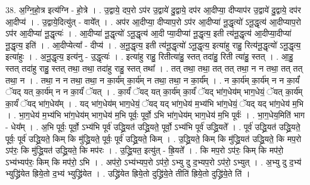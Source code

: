 \documentclass[17pt]{extarticle}
\begin{document}
38. अ॒ग्नि॒हो॒त्र इत्य॑ग्नि - हो॒त्रे । . उ॒द्वाये॒ दप॒रो ऽप॑र उ॒द्वाये॑ दु॒द्वाये॒ दप॑र आ॒दीप्या॒ दीप्याप॑र उ॒द्वाये॑ दु॒द्वाये॒ दप॑र आ॒दीप्य॑ । . उ॒द्वाये॒दित्यु॑त् - वाये᳚त् । . अप॑र आ॒दीप्या॒ दीप्याप॒रो ऽप॑र आ॒दीप्या॑ नू॒द्धृत्यो॑ ऽनू॒द्धृत्य॑ आ॒दीप्याप॒रो ऽप॑र आ॒दीप्या॑ नू॒द्धृत्यः॑ । . आ॒दीप्या॑ नू॒द्धृत्यो॑ ऽनू॒द्धृत्य॑ आ॒दी प्या॒दीप्या॑ नू॒द्धृत्य॒ इती त्य॑नू॒द्धृत्य॑ आ॒दीप्या॒दीप्या॑ नू॒द्धृत्य॒ इति॑ । . आ॒दीप्येत्या᳚ - दीप्य॑ । . अ॒नू॒द्धृत्य॒ इती त्य॑नू॒द्धृत्यो॑ ऽनू॒द्धृत्य॒ इत्या॑हु राहु॒ रित्य॑नू॒द्धृत्यो॑ ऽनू॒द्धृत्य॒ इत्या॑हुः । . अ॒नू॒द्धृत्य॒ इत्य॑नु - उ॒द्धृत्यः॑ । . इत्या॑हु राहु॒ रितीत्या॑हु॒ स्तत् तदा॑हु॒ रिती त्या॑हु॒ स्तत् । . आ॒हु॒ स्तत् तदा॑हु राहु॒ स्तत् तथा॒ तथा॒ तदा॑हु राहु॒ स्तत् तथा᳚ । . तत् तथा॒ तथा॒ तत् तत् तथा॒ न न तथा॒ तत् तत् तथा॒ न । . तथा॒ न न तथा॒ तथा॒ न का॒र्य॑म् का॒र्य॑म् न तथा॒ तथा॒ न का॒र्य᳚म् । . न का॒र्य॑म् का॒र्य॑म् न न का॒र्यं॑ ॅयद् यत् का॒र्य॑म् न न का॒र्यं॑ ॅयत् । . का॒र्यं॑ ॅयद् यत् का॒र्य॑म् का॒र्यं॑ ॅयद् भा॑ग॒धेय॑म् भाग॒धेयं॒ ॅयत् का॒र्य॑म् का॒र्यं॑ ॅयद् भा॑ग॒धेय᳚म् । . यद् भा॑ग॒धेय॑म् भाग॒धेयं॒ ॅयद् यद् भा॑ग॒धेय॑ म॒भ्य॑भि भा॑ग॒धेयं॒ ॅयद् यद् भा॑ग॒धेय॑ म॒भि । . भा॒ग॒धेय॑ म॒भ्य॑भि भा॑ग॒धेय॑म् भाग॒धेय॑ म॒भि पूर्वः॒ पूर्वो॒ ऽभि भा॑ग॒धेय॑म् भाग॒धेय॑ म॒भि पूर्वः॑ । . भा॒ग॒धेय॒मिति॑ भाग - धेय᳚म् । . अ॒भि पूर्वः॒ पूर्वो॒ ऽभ्य॑भि पूर्व॑ उद्ध्रि॒यत॑ उद्ध्रि॒यते॒ पूर्वो॒ ऽभ्य॑भि पूर्व॑ उद्ध्रि॒यते᳚ । . पूर्व॑ उद्ध्रि॒यत॑ उद्ध्रि॒यते॒ पूर्वः॒ पूर्व॑ उद्ध्रि॒यते॒ किम् कि मु॑द्ध्रि॒यते॒ पूर्वः॒ पूर्व॑ उद्ध्रि॒यते॒ किम् । . उ॒द्ध्रि॒यते॒ किम् कि मु॑द्ध्रि॒यत॑ उद्ध्रि॒यते॒ कि मप॒रो ऽप॑रः॒ कि मु॑द्ध्रि॒यत॑ उद्ध्रि॒यते॒ कि मप॑रः । . उ॒द्ध्रि॒यत॒ इत्यु॑त् - ह्रि॒यते᳚ । . कि मप॒रो ऽप॑रः॒ किम् कि मप॑रो॒ ऽभ्य॑भ्यप॑रः॒ किम् कि मप॑रो॒ ऽभि । . अप॑रो॒ ऽभ्य॑भ्यप॒रो ऽप॑रो॒ ऽभ्यु दु द॒भ्यप॒रो ऽप॑रो॒ ऽभ्युत् । . अ॒भ्यु दु द॒भ्य॑ भ्युद्ध्रि॑येत ह्रिये॒तो द॒भ्य॑ भ्युद्ध्रि॑येत । . उद्ध्रि॑येत ह्रिये॒तो दुद्ध्रि॑ये॒ते तीति॑ ह्रिये॒तो दुद्ध्रि॑ये॒ते ति॑ । \newline
\pagebreak
{}
\end{document}
